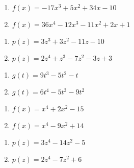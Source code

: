 \begin{multicols}{2}
\begin{enumerate}
\setcounter{enumi}{\value{HW}}

\item $f(x) = -17x^{3} + 5x^{2} + 34x - 10$
\item $f(x) = 36x^{4} - 12x^{3} - 11x^{2} + 2x + 1$

\setcounter{HW}{\value{enumi}}
\end{enumerate}
\end{multicols}

\begin{multicols}{2}
\begin{enumerate}
\setcounter{enumi}{\value{HW}}

\item $p(z) = 3z^{3} + 3z^{2} - 11z - 10$
\item $p(z) = 2z^4+z^3-7z^2-3z+3$

\setcounter{HW}{\value{enumi}}
\end{enumerate}
\end{multicols}

\begin{multicols}{2}
\begin{enumerate}
\setcounter{enumi}{\value{HW}}

\item $g(t) = 9t^{3} - 5t^{2} - t$
\item $g(t) = 6t^{4} - 5t^{3} - 9t^{2}$

\setcounter{HW}{\value{enumi}}
\end{enumerate}
\end{multicols}

\begin{multicols}{2}
\begin{enumerate}
\setcounter{enumi}{\value{HW}}

\item $f(x) = x^4+2x^2 - 15$
\item $f(x) = x^4-9x^2+14$

\setcounter{HW}{\value{enumi}}
\end{enumerate}
\end{multicols}

\begin{multicols}{2}
\begin{enumerate}
\setcounter{enumi}{\value{HW}}

\item $p(z) = 3z^4-14z^2-5$
\item $p(z) = 2z^4-7z^2+6$

\setcounter{HW}{\value{enumi}}
\end{enumerate}
\end{multicols}

